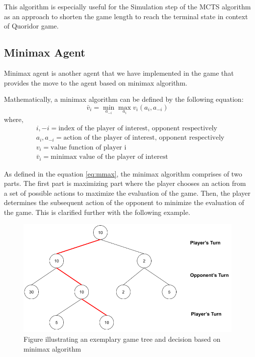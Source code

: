 This algorithm is especially useful for the Simulation step of the \gls{MCTS} algorithm as an approach to shorten the game length to reach the terminal state in context of Quoridor game.

\subsection{Minimax Agent}

Minimax agent is another agent that we have implemented in the game that provides the move to the agent based on minimax algorithm.

Mathematically, a minimax algorithm can be defined by the following equation:
\begin{equation}\label{eq:mmax}
    \bar{v}_i = \min_{a_{-i}} \max_{a_{i}} v_i (a_i, a_{-i})
\end{equation}
where,
\begin{subequations}
\begin{align}
    &i, -i = \text{index of the player of interest, opponent respectively} \\
    &a_i, a_{-i}= \text{action of the player of interest, opponent respectively} \\
    &v_i = \text{value function of player i} \\
    &\bar{v}_i = \text{minimax value of the player of interest}
\end{align}
\end{subequations}

As defined in the equation \eqref{eq:mmax}, the minimax algorithm comprises of two parts. The first part is maximizing part where the player chooses an action from a set of possible actions to maximize the evaluation of the game. Then, the player determines the subsequent action of the opponent to minimize the evaluation of the game. This is clarified further with the following example.

\begin{figure}
    \centering
    \includegraphics[width=\linewidth]{../img/Minimax1.png}
    \caption{Figure illustrating an exemplary game tree and decision based on minimax algorithm}
    \label{fig:minimax1}
\end{figure}


